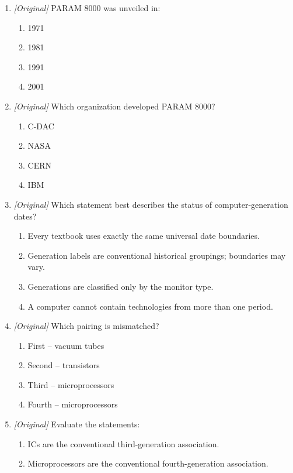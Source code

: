 \begin{enumerate}[label=\textbf{Q\arabic*.}, leftmargin=*]
\begin{enumerate}[label=\Alph*.]
    \item IBM PC
  \end{enumerate}
\item \textit{[Original]} PARAM 8000 was unveiled in:
  \begin{enumerate}[label=\Alph*.]
    \item 1971
    \item 1981
    \item 1991
    \item 2001
  \end{enumerate}
\item \textit{[Original]} Which organization developed PARAM 8000?
  \begin{enumerate}[label=\Alph*.]
    \item C-DAC
    \item NASA
    \item CERN
    \item IBM
  \end{enumerate}
\item \textit{[Original]} Which statement best describes the status of
  computer-generation dates?
  \begin{enumerate}[label=\Alph*.]
    \item Every textbook uses exactly the same universal date boundaries.
    \item Generation labels are conventional historical groupings; boundaries
      may vary.
    \item Generations are classified only by the monitor type.
    \item A computer cannot contain technologies from more than one period.
  \end{enumerate}
\item \textit{[Original]} Which pairing is mismatched?
  \begin{enumerate}[label=\Alph*.]
    \item First -- vacuum tubes
    \item Second -- transistors
    \item Third -- microprocessors
    \item Fourth -- microprocessors
  \end{enumerate}
\item \textit{[Original]} Evaluate the statements:
  \begin{enumerate}[label=\Roman*.]
    \item ICs are the conventional third-generation association.
    \item Microprocessors are the conventional fourth-generation association.

\end{enumerate}
\end{enumerate}
